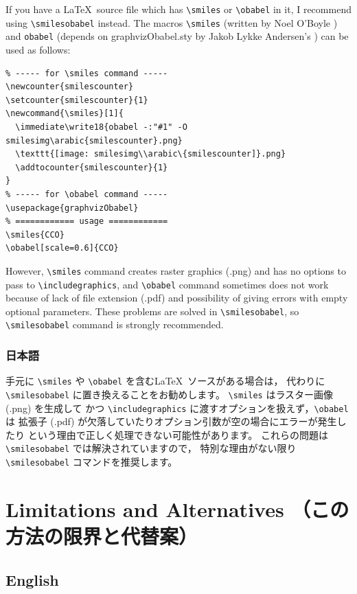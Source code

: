\documentclass[dvipdfmx,12pt]{jsarticle}
\begin{document}
If you have a \LaTeX\ source file which has \verb|\smiles| or
\verb|\obabel| in it, I recommend using \verb|\smilesobabel| instead.
The macros \verb|\smiles| (written by Noel O'Boyle \cite{NOB1}) and
\verb|obabel| (depends on \textsf{graphvizObabel.sty} by
Jakob Lykke Andersen's \cite{JLA}) can be used as follows:
\begin{verbatim}
% ----- for \smiles command -----
\newcounter{smilescounter}
\setcounter{smilescounter}{1}
\newcommand{\smiles}[1]{
  \immediate\write18{obabel -:"#1" -O smilesimg\arabic{smilescounter}.png}
  \texttt{[image: smilesimg\\arabic\{smilescounter]}.png}
  \addtocounter{smilescounter}{1}
}
% ----- for \obabel command -----
\usepackage{graphvizObabel}
% ============ usage ============
\smiles{CCO}
\obabel[scale=0.6]{CCO}
\end{verbatim}
However, \verb|\smiles| command creates raster graphics (.png) and
has no options to pass to \verb|\includegraphics|, and \verb|\obabel| command
sometimes does not work because of lack of file extension (.pdf) and
possibility of giving errors with empty optional parameters.
These problems are solved in \verb|\smilesobabel|, so
\verb|\smilesobabel| command is strongly recommended.

\subsubsection{日本語}

手元に \verb|\smiles| や \verb|\obabel| を含む\LaTeX\ ソースがある場合は，
代わりに \verb|\smilesobabel| に置き換えることをお勧めします。
\verb|\smiles| はラスター画像 (.png) を生成して
かつ \verb|\includegraphics| に渡すオプションを扱えず，\verb|\obabel| は
拡張子 (.pdf) が欠落していたりオプション引数が空の場合にエラーが発生したり
という理由で正しく処理できない可能性があります。
これらの問題は \verb|\smilesobabel| では解決されていますので，
特別な理由がない限り \verb|\smilesobabel| コマンドを推奨します。

\clearpage

\section{Limitations and Alternatives （この方法の限界と代替案）}

\subsection{English}
\end{document}
